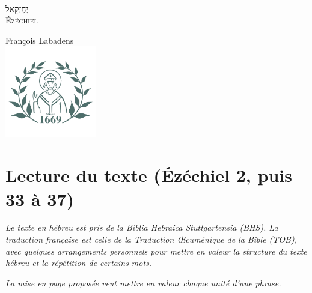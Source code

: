 \documentclass[12pt,a4paper,titlepage]{article}
\author{}
\date{}
\begin{document}
\thispagestyle{empty} %

~
\vspace{10em}
\begin{center}
\fontsize{60}{70}\selectfont \texthebrew{יְחֶזְקֵאל}\\
\fontsize{50}{40}\selectfont \textsc{Ézéchiel} \par
\normalsize François Labadens \\
\vfill
\includegraphics[width=4cm]{../assets/seminaire_lyon.png}
\end{center}

\newpage
\setcounter{page}{2} %

\newpage

\vspace{2em}

\newpage

\newpage

\newpage

\vspace{2em}
\section*{Lecture du texte (Ézéchiel 2, puis 33 à 37)}
\textit{Le texte en hébreu est pris de la Biblia Hebraica Stuttgartensia (BHS).
La traduction française est celle de la Traduction Œcuménique de la Bible (TOB), avec quelques arrangements personnels pour mettre en valeur la structure du texte hébreu et la répétition de certains mots.}\par
\textit{La mise en page proposée veut mettre en valeur chaque unité d'une phrase.}
\newpage

\end{document}
